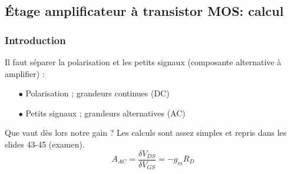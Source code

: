 	
	
	
	\subsection{Étage amplificateur à transistor MOS: calcul}
		\subsubsection{Introduction}
		Il faut séparer la polarisation et les petits signaux (composante alternative à 
		amplifier) :
		\begin{itemize}
		\item[$\bullet$] Polarisation ; grandeurs continues (DC)
		\item[$\bullet$] Petits signaux ; grandeurs alternatives (AC)		
		\end{itemize}
	
		Que vaut dès lors notre gain ? Les calculs sont assez simples et repris dans les 
		slides 43-45 (\danger examen).
		\begin{equation}
		A_{AC} = \dfrac{\delta V_{DS}}{\delta V_{GS}} = -g_mR_D
		\end{equation}
		
	
	
	
	
	
	
	
	
	
	
	
	
	
	
	
	
	
	
	
	
	
	